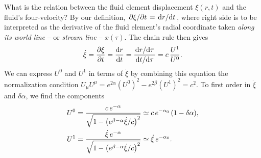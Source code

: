 What is the relation between the fluid element displacement $\xi(r,t)$ and the fluid's four-velocity?
By our definition, $\pdv{\xi}/{t} = \odv{r}/{t}$, where right side is to be interpreted as the derivative of the fluid element's radial coordinate taken \emph{along its world line} -- or \emph{stream line} -- $x(\tau)$.
The chain rule then gives
\begin{equation}
	\dot\xi = \pdv{\xi}{t} = \odv{r}{t} = \frac{\odv{r}/{\tau}}{\odv{t}/{\tau}} = c \, \frac{U^1}{U^0} .
\end{equation}
We can express $U^0$ and $U^1$ in terms of $\dot\xi$ by combining this equation the normalization condition $U_\mu U^\mu = e^{2 \alpha} \left( U^0 \right)^2 - e^{2 \beta} \left( U^1 \right)^2 = c^2$.
To first order in $\dot\xi$ and $\delta \alpha$, we find the components
\begin{subequations}
\begin{align}
	U^0 &= \frac{c \, e^{-\alpha}}{\sqrt{1 - \left( e^{\beta-\alpha} \dot\xi / c \right)^2 }} \simeq c \, e^{-\alpha_0} \, (1 - \delta \alpha), \\
	U^1 &= \frac{\dot\xi \, e^{-\alpha}}{\sqrt{1 - \left( e^{\beta-\alpha} \dot\xi / c \right)^2 }} \simeq \dot\xi \, e^{-\alpha_0} .
\end{align}
\label{eq:nstars:velocity_components}
\end{subequations}

